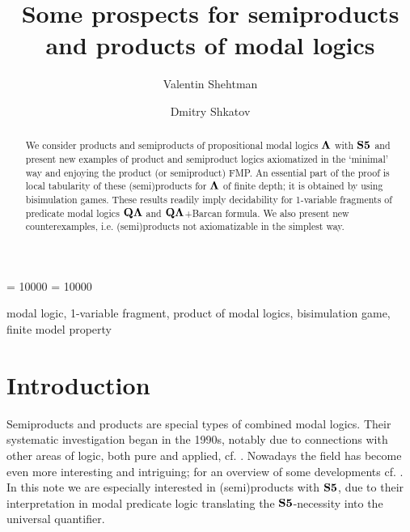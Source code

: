 \documentclass[twoside]{aiml20}
\def\BQ{{\bf Q}}
\def\bLa{{\bf \Lambda}}
\def\bLa{{\bf \Lambda}}
\def\bS5{{\bf S5}}
\begin{document}
{
\binoppenalty = 10000
\relpenalty   = 10000

\renewcommand{\leftheadline}{\ifnum\value{page}=\hypergetpageref{FirstPage}\firstheadline
      \else\eightrm \thepage\quad\hfill\ifshttl\shtitle\else{Some prospects for semiproducts and products of modal logics}\fi\hfill\fi}

\begin{frontmatter}

  \title{Some prospects for semiproducts and products of modal logics}

  \author{Valentin Shehtman} \address{Institute for Information
    Transmission Problems, Russian Academy of Sciences \\ National
    Research University Higher School of Economics \\
    Moscow State University, Moscow, Russia}

  \author{Dmitry Shkatov}

  \address{School of Computer Science and Applied Mathematics, \\
    University of the Witwatersrand, Johannesburg, South Africa}

  \begin{abstract}
    We consider products and semiproducts of propositional modal
    logics $\bLa$ with $\bS5$ and present new examples of product and
    semiproduct logics axiomatized in the `minimal' way and enjoying
    the product (or semiproduct) FMP. An essential part of the proof
    is local tabularity of these (semi)products for $\bLa$ of finite
    depth; it is obtained by using bisimulation games. These results
    readily imply decidability for 1-variable fragments of predicate
    modal logics $\BQ\bLa$ and $\BQ\bLa$+Barcan formula.  We also
    present new counterexamples, i.e. (semi)products not axiomatizable
    in the simplest way.
  \end{abstract}

  \begin{keyword}
    modal logic, 1-variable fragment, product of modal logics,
    bisimulation game, finite model property
  \end{keyword}
\end{frontmatter}

\section{Introduction}
Semiproducts and products are special types of combined modal
logics. Their systematic investigation began in the 1990s, notably due
to connections with other areas of logic, both pure and applied,
cf. \cite{GKWZ}.  Nowadays the field has become even more interesting
and intriguing; for an overview of some developments cf. \cite{K08}.
In this note we are especially interested in (semi)products with
$\bS5$, due to their interpretation in modal
predicate logic translating the $\bS5$-necessity into the universal
quantifier.

}
\end{document}

